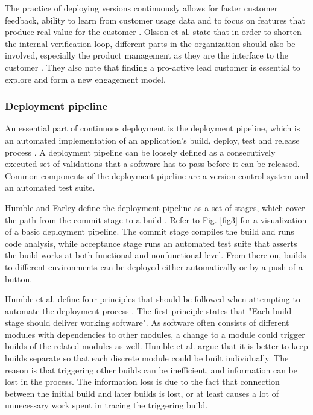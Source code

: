\documentclass[english]{tktltiki2}
\theoremstyle{definition}
\theoremstyle{remark}
\begin{document}
The practice of deploying versions continuously allows for faster customer feedback, ability to learn from customer usage data and to focus on features that produce real value for the customer \cite{olsson2012climbing}. Olsson et al. state that in order to shorten the internal verification loop, different parts in the organization should also be involved, especially the product management as they are the interface to the customer \cite{olsson2012climbing}. They also note that finding a pro-active lead customer is essential to explore and form a new engagement model.

\subsubsection{Deployment pipeline}
An essential part of continuous deployment is the deployment pipeline, which is an automated implementation of an application's build, deploy, test and release process \cite{cdbook}. A deployment pipeline can be loosely defined as a consecutively executed set of validations that a software has to pass before it can be released. Common components of the deployment pipeline are a version control system and an automated test suite.

Humble and Farley define the deployment pipeline as a set of stages, which cover the path from the commit stage to a build \cite{cdbook}. Refer to Fig. \ref{fig3} for a visualization of a basic deployment pipeline. The commit stage compiles the build and runs code analysis, while acceptance stage runs an automated test suite that asserts the build works at both functional and nonfunctional level. From there on, builds to different environments can be deployed either automatically or by a push of a button.

Humble et al. define four principles that should be followed when attempting to automate the deployment process \cite{humble2006deployment}. The first principle states that "Each build stage should deliver working software". As software often consists of different modules with dependencies to other modules, a change to a module could trigger builds of the related modules as well. Humble et al. argue that it is better to keep builds separate so that each discrete module could be built individually. The reason is that triggering other builds can be inefficient, and information can be lost in the process. The information loss is due to the fact that connection between the initial build and later builds is lost, or at least causes a lot of unnecessary work spent in tracing the triggering build. 
\end{document}
